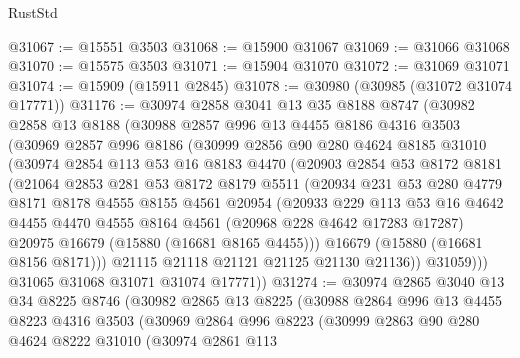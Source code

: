 \begin{lexlean}{RustStd}
\begin{coremodule}
@31067 := @15551 @3503
@31068 := @15900 @31067
@31069 := @31066 @31068
@31070 := @15575 @3503
@31071 := @15904 @31070
@31072 := @31069 @31071
@31074 := @15909 (@15911 @2845)
@31078 := @30980 (@30985 (@31072 @31074 @17771))
@31176 := @30974
    @2858
    @3041
    @13
    @35
    @8188
    @8747
    (@30982
      @2858
      @13
      @8188
      (@30988
        @2857
        @996
        @13
        @4455
        @8186
        @4316
        @3503
        (@30969
          @2857
          @996
          @8186
          (@30999
            @2856
            @90
            @280
            @4624
            @8185
            @31010
            (@30974
              @2854
              @113
              @53
              @16
              @8183
              @4470
              (@20903
                @2854
                @53
                @8172
                @8181
                (@21064
                  @2853
                  @281
                  @53
                  @8172
                  @8179
                  @5511
                  (@20934
                    @231
                    @53
                    @280
                    @4779
                    @8171
                    @8178
                    @4555
                    @8155
                    @4561
                    @20954
                    (@20933
                      @229
                      @113
                      @53
                      @16
                      @4642
                      @4455
                      @4470
                      @4555
                      @8164
                      @4561
                      (@20968 @228 @4642 @17283 @17287)
                      @20975
                      @16679
                      (@15880 (@16681 @8165 @4455)))
                    @16679
                    (@15880 (@16681 @8156 @8171)))
                  @21115
                  @21118
                  @21121
                  @21125
                  @21130
                  @21136))
              @31059)))
        @31065
        @31068
        @31071
        @31074
        @17771))
@31274 := @30974
    @2865
    @3040
    @13
    @34
    @8225
    @8746
    (@30982
      @2865
      @13
      @8225
      (@30988
        @2864
        @996
        @13
        @4455
        @8223
        @4316
        @3503
        (@30969
          @2864
          @996
          @8223
          (@30999
            @2863
            @90
            @280
            @4624
            @8222
            @31010
            (@30974
              @2861
              @113

\end{coremodule}
\end{lexlean}
